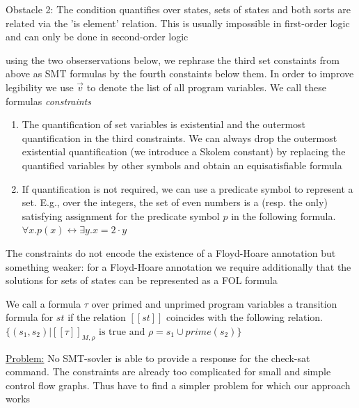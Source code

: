 \documentclass[landscape, a4paper]{article}
\begin{document}
\begin{minipage}[t]{0.2\linewidth}
	\begin{betterlist}
		\item \alert{Obstacle 2:} The condition quantifies over states, sets of states and both sorts are related via the 'is element' relation. This is usually impossible in first-order logic and can only be done in second-order logic
		\begin{betterlist}
			\item using the two obserservations below, we rephrase the third set constaints from above as SMT formulas by the fourth constaints below them. In order to improve legibility we use $\vec{v}$ to denote the list of all program variables. We call these formulas \textit{constraints}
			\begin{enumerate}
				\item The quantification of set variables is existential and the outermost quantification in the third constraints. We can always drop the outermost existential quantification (we introduce a Skolem constant) by replacing the quantified variables by other symbols and obtain an equisatisfiable formula
				\item If quantification is not required, we can use a predicate symbol to represent a set. E.g., over the integers, the set of even numbers is a (resp. the only) satisfying assignment for the predicate symbol $p$ in the following formula. $\forall x.p(x) \leftrightarrow \exists y.x = 2 \cdot y$
			\end{enumerate}
			\item The constraints do not encode the existence of a Floyd-Hoare annotation but something weaker: for a Floyd-Hoare annotation we require additionally that the solutions for sets of states can be represented as a FOL formula
		\end{betterlist}
		\item \color{orange}We call a formula $\tau$ over primed and unprimed program variables a \alert{transition formula} for $st$ if the relation $[[st]]$ coincides with the following relation. $\{(s_1, s_2) | [[\tau]]_{M,\rho} \text{ is true and } \rho = s_1 \cup prime(s_2)\}$\color{black}
		\begin{betterlist}
			\item {}
		\end{betterlist}
		\item \underline{Problem:} No SMT-sovler is able to provide a response for the check-sat command. The constraints are already too complicated for small and simple control flow graphs. Thus have to find a simpler problem for which our approach works

\end{betterlist}
\end{minipage}
\end{document}
